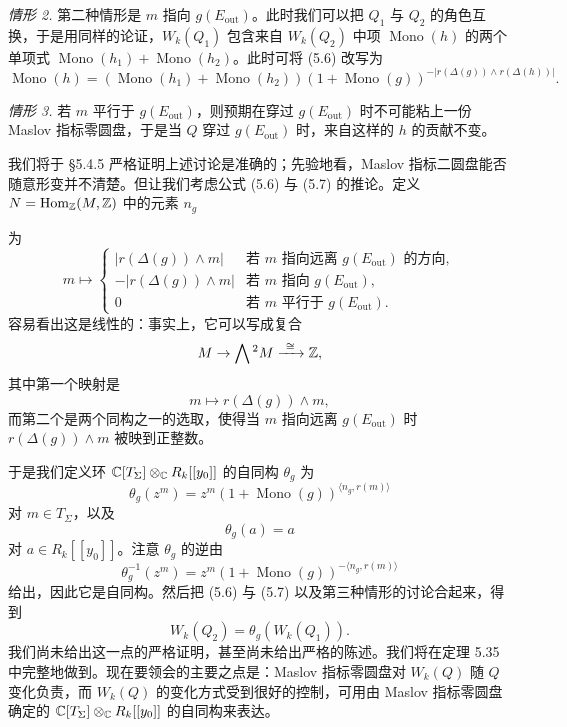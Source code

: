 \textit{情形 2.} 第二种情形是 $m$ 指向 $g(E_{\mathrm{out}})$。此时我们可以把 $Q_1$ 与 $Q_2$ 的角色互换，于是用同样的论证，$W_k(Q_1)$ 包含来自 $W_k(Q_2)$ 中项 $\operatorname{Mono}(h)$ 的两个单项式 $\operatorname{Mono}(h_1)+\operatorname{Mono}(h_2)$。此时可将 (5.6) 改写为
\begin{equation}
  \operatorname{Mono}(h)=(\operatorname{Mono}(h_1)+\operatorname{Mono}(h_2))(1+\operatorname{Mono}(g))^{-|r(\Delta(g))\wedge r(\Delta(h))|}.
  \tag{5.7}
\end{equation}

\textit{情形 3.} 若 $m$ 平行于 $g(E_{\mathrm{out}})$，则预期在穿过 $g(E_{\mathrm{out}})$ 时不可能粘上一份 Maslov 指标零圆盘，于是当 $Q$ 穿过 $g(E_{\mathrm{out}})$ 时，来自这样的 $h$ 的贡献不变。

我们将于 §5.4.5 严格证明上述讨论是准确的；先验地看，Maslov 指标二圆盘能否随意形变并不清楚。但让我们考虑公式 (5.6) 与 (5.7) 的推论。定义 $N=\operatorname{Hom}_{\mathbb{Z}}(M,\mathbb{Z})$ 中的元素 $n_g$


为
\[
  m\mapsto
  \begin{cases}
    |r(\Delta(g))\wedge m| & \text{若 } m \text{ 指向远离 } g(E_{\mathrm{out}}) \text{ 的方向},\\
    -|r(\Delta(g))\wedge m| & \text{若 } m \text{ 指向 } g(E_{\mathrm{out}}),\\
    0 & \text{若 } m \text{ 平行于 } g(E_{\mathrm{out}}).
  \end{cases}
\]
容易看出这是线性的：事实上，它可以写成复合
\[
  M\to\bigwedge{}^2M\xrightarrow{\ \cong\ }\Z,
\]
其中第一个映射是
\[
  m\mapsto r(\Delta(g))\wedge m,
\]
而第二个是两个同构之一的选取，使得当 $m$ 指向远离 $g(E_{\mathrm{out}})$ 时 $r(\Delta(g))\wedge m$ 被映到正整数。

于是我们定义环 $\mathbb{C}[T_\Sigma]\otimes_{\mathbb{C}} R_k[[y_0]]$ 的自同构 $\theta_g$ 为
\[
  \theta_g(z^m)=z^m(1+\operatorname{Mono}(g))^{\langle n_g,r(m)\rangle}
\]
对 $m\in T_\Sigma$，以及
\[
  \theta_g(a)=a
\]
对 $a\in R_k[[y_0]]$。注意 $\theta_g$ 的逆由
\[
  \theta_g^{-1}(z^m)=z^m(1+\operatorname{Mono}(g))^{-\langle n_g,r(m)\rangle}
\]
给出，因此它是自同构。然后把 (5.6) 与 (5.7) 以及第三种情形的讨论合起来，得到
\begin{equation}
  W_k(Q_2)=\theta_g(W_k(Q_1)). \tag{5.8}
\end{equation}
我们尚未给出这一点的严格证明，甚至尚未给出严格的陈述。我们将在定理 5.35 中完整地做到。现在要领会的主要之点是：Maslov 指标零圆盘对 $W_k(Q)$ 随 $Q$ 变化负责，而 $W_k(Q)$ 的变化方式受到很好的控制，可用由 Maslov 指标零圆盘确定的 $\mathbb{C}[T_\Sigma]\otimes_{\mathbb{C}} R_k[[y_0]]$ 的自同构来表达。

